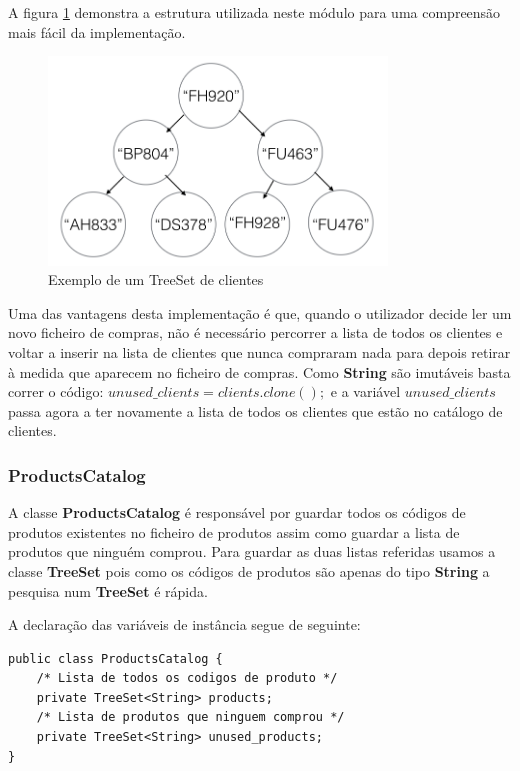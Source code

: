 \documentclass[10pt] {article}
\begin{document}
\par A figura \ref{fig:catclientes} demonstra a estrutura utilizada neste módulo para uma compreensão mais fácil da implementação.

\begin{figure}[ht!]
\centering
\includegraphics[width=90mm]{catclientes.png}
\caption{Exemplo de um TreeSet de clientes}
\label{fig:catclientes}
\end{figure}

Uma das vantagens desta implementação é que, quando o utilizador decide ler um novo ficheiro de compras, não é necessário percorrer a lista de todos os clientes e voltar a inserir na lista de clientes que nunca compraram nada para depois retirar à medida que aparecem no ficheiro de compras.
Como \color{blue} \textbf{String} \color{black}são imutáveis basta correr o código:
$unused\_clients = clients.clone();$ e a variável $unused\_clients$ passa agora a ter novamente a lista de todos os clientes que estão no catálogo de clientes.

\subsubsection{ProductsCatalog\label{catalogoprodutos}}

A classe \color{blue} \textbf{ProductsCatalog} \color{black} é responsável por guardar todos os códigos de produtos existentes
no ficheiro de produtos assim como guardar a lista de produtos que ninguém comprou.
Para guardar as duas listas referidas usamos a classe \color{blue} \textbf{TreeSet} \color{black} pois como os códigos de
produtos são apenas do tipo \color{blue} \textbf{String} \color{black} a pesquisa num \color{blue} \textbf{TreeSet} \color{black}é
rápida.

A declaração das variáveis de instância segue de seguinte:

\begin{lstlisting}
public class ProductsCatalog {
	/* Lista de todos os codigos de produto */
	private TreeSet<String> products;
	/* Lista de produtos que ninguem comprou */
	private TreeSet<String> unused_products;
}
\end{lstlisting}
\end{document}
